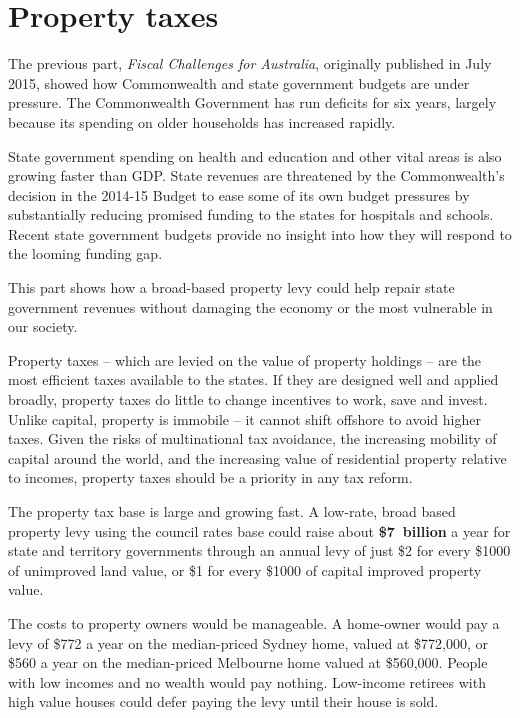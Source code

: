 \part{Property taxes}\label{part:PROP}
\addtolength{\overviewextra}{1pt}
\begin{overview}[-25pt]
The previous part, \textit{Fiscal Challenges for Australia}, originally published in July 2015,\DEVIATION{} showed how Commonwealth and state government budgets are under pressure. The Commonwealth Government has run deficits for six years, largely because its spending on older households has increased rapidly. 

State government spending on health and education and other vital areas is also growing faster than GDP\@. State revenues are threatened by the Commonwealth’s decision in the 2014-15 Budget to ease some of its own budget pressures by substantially reducing promised funding to the states for hospitals and schools. Recent state government budgets provide no insight into how they will respond to the looming funding gap. 

This part shows how a broad-based property levy could help repair state government revenues without damaging the economy or the most vulnerable in our society.

Property taxes – which are levied on the value of property holdings – are the most efficient taxes available to the states. If they are designed well and applied broadly, property taxes do little to change incentives to work, save and invest. Unlike capital, property is immobile – it cannot shift offshore to avoid higher taxes. Given the risks of multinational tax avoidance, the increasing mobility of capital around the world, and the increasing value of residential property relative to incomes, property taxes should be a priority in any tax reform.

The property tax base is large and growing fast. A low-rate, broad based property levy using the council rates base could raise about \textbf{\$7~billion} a year for state and territory governments through an annual levy of just \$2 for every \$1000 of unimproved land value, or \$1 for every \$1000 of capital improved property value. 

The costs to property owners would be manageable. A home-owner would pay a levy of \$772 a year on the median-priced Sydney home, valued at \$772,000, or \$560 a year on the median-priced Melbourne home valued at \$560,000. People with low incomes and no wealth would pay nothing. Low-income retirees with high value houses could defer paying the levy until their house is sold.


\end{overview}
